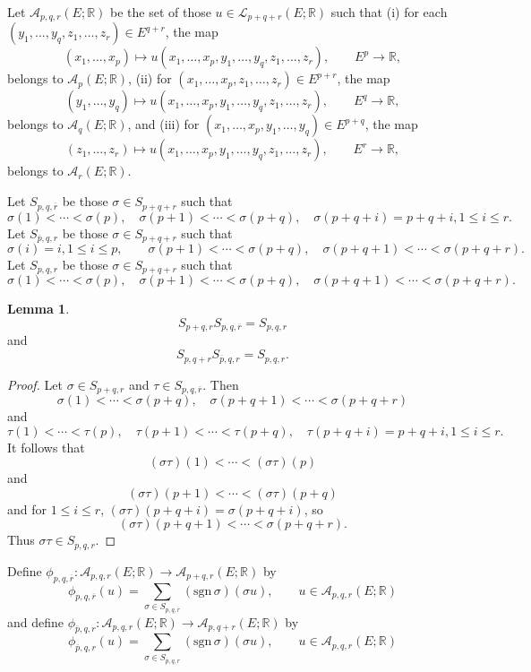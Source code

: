 \documentclass{article}
\newcommand{\sgn}{\mathrm{sgn}\,}
\theoremstyle{definition}
\newtheorem{lemma}[theorem]{Lemma}
\theoremstyle{definition}
\begin{document}
Let $\mathscr{A}_{p,q,r}(E;\mathbb{R})$ be the set of those
$u \in \mathscr{L}_{p+q+r}(E;\mathbb{R})$ such that (i) for each $(y_1,\ldots,y_q,z_1,\ldots,z_r) \in E^{q+r}$, the map
\[
(x_1,\ldots,x_p) \mapsto u(x_1,\ldots,x_p,y_1,\ldots,y_q,z_1,\ldots,z_r),\qquad
E^p \to \mathbb{R},
\]
belongs to $\mathscr{A}_p(E;\mathbb{R})$,  (ii)
for $(x_1,\ldots,x_p,z_1,\ldots,z_r) \in E^{p+r}$, the map
\[
(y_1,\ldots,y_q) \mapsto u(x_1,\ldots,x_p,y_1,\ldots,y_q,z_1,\ldots,z_r),
\qquad E^q \to \mathbb{R},
\]
belongs to $\mathscr{A}_q(E;\mathbb{R})$, and (iii)
for $(x_1,\ldots,x_p,y_1,\ldots,y_q) \in E^{p+q}$, the map
\[
(z_1,\ldots,z_r) \mapsto u(x_1,\ldots,x_p,y_1,\ldots,y_q,z_1,\ldots,z_r),
\qquad E^r \to \mathbb{R},
\]
belongs to $\mathscr{A}_r(E;\mathbb{R})$. 

Let $S_{p,q,\overline{r}}$ be those $\sigma \in S_{p+q+r}$ such that
\[
\sigma(1)<\cdots<\sigma(p),
\quad \sigma(p+1)<\cdots<\sigma(p+q),
\quad \sigma(p+q+i)=p+q+i, 1 \leq i \leq r.
\]
Let $S_{\overline{p},q,r}$ be those $\sigma \in S_{p+q+r}$ such that
\[
\sigma(i)=i, 1 \leq i \leq p,
\quad 
\quad \sigma(p+1)<\cdots<\sigma(p+q),
\quad \sigma(p+q+1)<\cdots<\sigma(p+q+r).
\]
Let $S_{p,q,r}$ be those $\sigma \in S_{p+q+r}$ such that
\[
\sigma(1)<\cdots<\sigma(p),
\quad \sigma(p+1)<\cdots<\sigma(p+q),
\quad \sigma(p+q+1)<\cdots<\sigma(p+q+r).
\]


\begin{lemma}
\[
S_{p+q,r} S_{p,q,\overline{r}} = S_{p,q,r}
\]
and
\[
S_{p,q+r} S_{\overline{p},q,r} = S_{p,q,r}.
\]
\label{pqr}
\end{lemma}
\begin{proof}
Let $\sigma \in S_{p+q,r}$ and $\tau \in S_{p,q,\overline{r}}$. Then 
\[
\sigma(1)<\cdots<\sigma(p+q), \quad
\sigma(p+q+1)<\cdots<\sigma(p+q+r)
\]
and
\[
\tau(1)<\cdots<\tau(p),
\quad \tau(p+1)<\cdots<\tau(p+q),
\quad \tau(p+q+i)=p+q+i, 1 \leq i \leq r.
\]
It follows that
\[
(\sigma \tau)(1)<\cdots<(\sigma \tau)(p)
\]
and
\[
(\sigma \tau)(p+1)<\cdots<(\sigma \tau)(p+q)
\]
and for $1 \leq i \leq r$,
$(\sigma \tau)(p+q+i) = \sigma(p+q+i)$, so
\[
(\sigma \tau)(p+q+1)<\cdots<\sigma(p+q+r).
\]
Thus $\sigma \tau \in S_{p,q,r}$. 
\end{proof}



Define $\phi_{p,q,\overline{r}}:\mathscr{A}_{p,q,r}(E;\mathbb{R}) \to \mathscr{A}_{p+q,r}(E;\mathbb{R})$
by 
\[
\phi_{p,q,\overline{r}}(u) = \sum_{\sigma \in S_{p,q,\overline{r}}} (\sgn \sigma)(\sigma u),
\qquad u \in \mathscr{A}_{p,q,r}(E;\mathbb{R})
\]
and
define $\phi_{\overline{p},q,r}:\mathscr{A}_{p,q,r}(E;\mathbb{R}) \to \mathscr{A}_{p,q+r}(E;\mathbb{R})$
by 
\[
\phi_{\overline{p},q,r}(u) = \sum_{\sigma \in S_{\overline{p},q,r}} (\sgn \sigma)(\sigma u),
\qquad u \in \mathscr{A}_{p,q,r}(E;\mathbb{R})
\]
\end{document}
